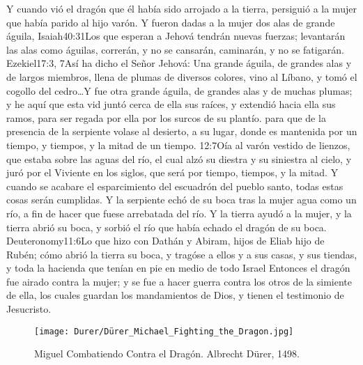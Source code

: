 Y cuando vió el dragón que él había sido arrojado a la tierra, persiguió a la mujer que había parido al hijo varón.
Y fueron dadas a la mujer dos alas de grande águila,%
				   {Isaiah}{40:31}{Los que esperan a Jehová tendrán nuevas fuerzas; levantarán las alas como águilas, correrán, y no se cansarán, caminarán, y no se fatigarán.}%
				   {Ezekiel}{17:3, 7}{Así ha dicho el Señor Jehová: Una grande águila, de grandes alas y de largos miembros, llena de plumas de diversos colores, vino al Líbano, y tomó el cogollo del cedro\ldots Y fue otra grande águila, de grandes alas y de muchas plumas; y he aquí que esta vid juntó cerca de ella sus raíces, y extendió hacia ella sus ramos, para ser regada por ella por los surcos de su plantío.}
 para que de la presencia de la serpiente volase al desierto, a su lugar, donde es mantenida por un tiempo, y tiempos, y la mitad de un tiempo.%
				    {12:7}{Oía al varón vestido de lienzos, que estaba sobre las aguas del río, el cual alzó su diestra y su siniestra al cielo, y juró por el Viviente en los siglos, que será por tiempo, tiempos, y la mitad. Y cuando se acabare el esparcimiento del escuadrón del pueblo santo, todas estas cosas serán cumplidas.}
Y la serpiente echó de su boca tras la mujer agua como un río, a fin de hacer que fuese arrebatada del río. 
Y la tierra ayudó a la mujer, y la tierra abrió su boca, y sorbió el río que había echado el dragón de su boca.%
				  {Deuteronomy}{11:6}{Lo que hizo con Dathán y Abiram, hijos de Eliab hijo de Rubén; cómo abrió la tierra su boca, y tragóse a ellos y a sus casas, y sus tiendas, y toda la hacienda que tenían en pie en medio de todo Israel}
Entonces el dragón fue airado contra la mujer; y se fue a hacer guerra contra los otros de la simiente de ella, los cuales guardan los mandamientos de Dios, y tienen el testimonio de Jesucristo.%

\begin{figure*}[p]
  	\centering
  	\texttt{[image: Durer/Dürer\_Michael\_Fighting\_the\_Dragon.jpg]}
  	\caption[Miguel Combatiendo Contra el Dragón]{Miguel Combatiendo Contra el Dragón. Albrecht Dürer, 1498.}
  \end{figure*}
